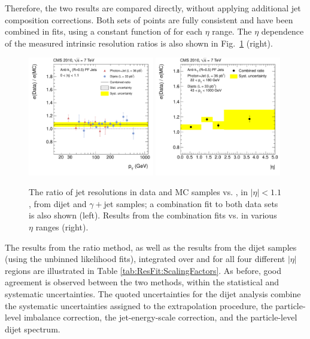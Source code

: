 Therefore, the two results are compared directly, without applying additional jet composition corrections. Both sets of points are fully consistent and have been combined in fits, using a constant function of \pt for each $\eta$ range. The $\eta$ dependence of the measured intrinsic resolution ratios is also shown in Fig.~\ref{fig:ResolutionRatioSum} (right).

\begin{figure}[htbp]
\begin{center}
\includegraphics[width=0.49\textwidth]{Figures/JER/figs/res_photon/CombinedResolution_Eta0.pdf}
\includegraphics[width=0.49\textwidth]{Figures/JER/figs/res_photon/CombinedResolutionVsEta.pdf}
\end{center}
\caption[]{The ratio of jet \pt resolutions in data and MC samples vs. \pt, in $|\eta|<1.1$, from dijet and $\gamma+$jet samples; a combination fit to both  data sets is also shown (left). Results from the combination  fits vs. \pt in various $\eta$ ranges (right).}
\label{fig:ResolutionRatioSum}
\end{figure}

The results from the ratio method, as well as the results  from the dijet samples (using the unbinned likelihood fits), integrated over \pt and for all four different $|\eta|$ regions are illustrated in Table \ref{tab:ResFit:ScalingFactors}. As before, good agreement is observed between the two methods, within the statistical and systematic uncertainties. The quoted uncertainties for the dijet analysis combine the systematic uncertainties assigned to the extrapolation procedure,  the particle-level imbalance correction, the jet-energy-scale correction, and the particle-level dijet \pt spectrum. 

